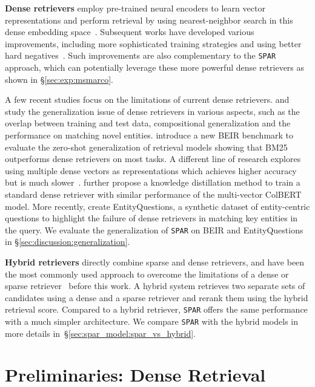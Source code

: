 \documentclass[11pt]{article}
\newcommand{\spar}{\texttt{SPAR}\xspace}
\newcommand{\secref}[1]{\S\ref{#1}}
\begin{document}
\noindent\textbf{Dense retrievers} employ pre-trained neural encoders to learn vector representations and perform retrieval by using nearest-neighbor search in this dense embedding space~\cite{lee-etal-2019-latent,karpukhin-etal-2020-dense}.
Subsequent works have developed various improvements, including more sophisticated training strategies and using better hard negatives~\cite{xiong2021approximate,qu-etal-2021-rocketqa,maillard-etal-2021-multi,dpr-scale}.
Such improvements are also complementary to the \spar{} approach, which can potentially leverage these more powerful dense retrievers as shown in \secref{sec:exp:msmarco}.

A few recent studies focus on the limitations of current dense retrievers.
\citet{lewis-etal-2021-question} and \citet{liu2021challenges} study the generalization issue of dense retrievers in various aspects, such as the overlap between training and test data, compositional generalization and the performance on matching novel entities.
\citet{thakur2021beir} introduce a new BEIR benchmark to evaluate the zero-shot generalization of retrieval models showing that BM25 outperforms dense retrievers on most tasks.
A different line of research explores using multiple dense vectors as representations which achieves higher accuracy but is much slower~\cite{colbert}.
\citet{lin-etal-2021-batch} further propose a knowledge distillation method to train a standard dense retriever with similar performance of the multi-vector ColBERT model.
More recently, \citet{sciavolino2021simple} create EntityQuestions, a synthetic dataset of entity-centric questions to highlight the failure of dense retrievers in matching key entities in the query.
We evaluate the generalization of \spar{} on BEIR and EntityQuestions in \secref{sec:discussion:generalization}.

\noindent\textbf{Hybrid retrievers} directly combine sparse and dense retrievers, and have been the most commonly used approach to overcome the limitations of a dense or sparse retriever~\cite{DBLP:conf/ecir/GaoDCFDC21,ma2021replication} before this work.
A hybrid system retrieves two separate sets of candidates using a dense and a sparse retriever and rerank them using the hybrid retrieval score.
Compared to a hybrid retriever, \spar{} offers the same performance with a much simpler architecture.
We compare \spar{} with the hybrid models in more details in~\secref{sec:spar_model:spar_vs_hybrid}. 
\section{Preliminaries: Dense Retrieval}
\label{sec:background}
\end{document}
